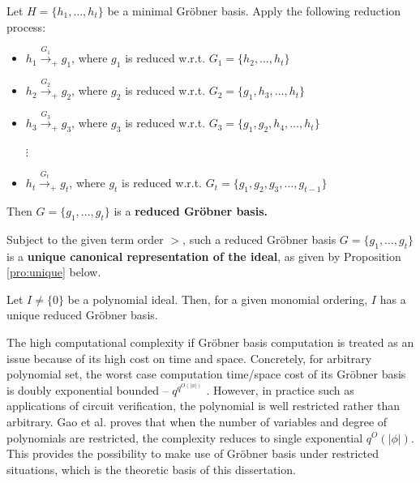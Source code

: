 \begin{Definition}
Let $H = \{h_1, \ldots, h_t\}$ be a minimal Gr\"obner basis.  Apply
the following reduction process: 
\begin{itemize}
\item $h_1 \stackrel{G_1}{\textstyle\longrightarrow}_+ g_1$, where
  $g_1$ is reduced w.r.t. $G_1 = \{h_2, \ldots, h_t\}$

\item $h_2 \stackrel{G_2}{\textstyle\longrightarrow}_+ g_2$, where
  $g_2$ is reduced w.r.t. $G_2 = \{g_1, h_3, \ldots, h_t\}$
\item $h_3 \stackrel{G_3}{\textstyle\longrightarrow}_+ g_3$, where
  $g_3$ is reduced w.r.t. $G_3 = \{g_1, g_2, h_4, \ldots, h_t\}$

\hspace{0.25in} $\vdots$
\vspace{0.1in}
\item $h_t \stackrel{G_t}{\textstyle\longrightarrow}_+ g_t$, where
  $g_t$ is reduced w.r.t. $G_t = \{g_1, g_2, g_3, \ldots, g_{t-1}\}$
\end{itemize}
Then $G = \{g_1, \ldots, g_t\}$ is a {\bf reduced Gr\"obner basis.}
\end{Definition}


Subject to the given term order $>$, such a reduced Gr\"obner
  basis $G = \{g_1, \dots, g_t\}$ is a {\bf unique canonical
    representation of the ideal}, as 
given by Proposition \ref{pro:unique} below.


\begin{Proposition}\label{pro:unique} \cite{gb_book} 
Let $I \neq \{0\}$ be a polynomial ideal. Then, for a given monomial ordering, $I$ has a unique reduced Gr\"obner basis.
\end{Proposition}


The high computational complexity if Gr\"obner basis computation is treated as an issue
because of its high cost on time and space. Concretely, for arbitrary polynomial set, 
the worst case computation time/space cost of its Gr\"obner basis is doubly exponential bounded -- $q^{q^{O(|\phi|)}}$
\cite{dube1986complexity}. However, in practice such as applications of circuit verification, 
the polynomial is well restricted rather than arbitrary.
Gao et al. \cite{gao:qe-gf-gb} proves that when the number of variables and degree of polynomials 
are restricted, the complexity reduces to single exponential $q^O(|\phi|)$.
This provides the possibility to make use of Gr\"obner basis under restricted situations,
which is the theoretic basis of this dissertation.

